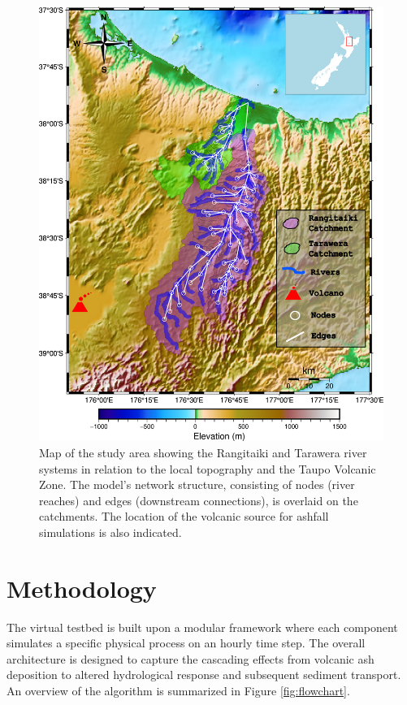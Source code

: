 \documentclass[12pt, a4paper]{article}
\begin{document}
\begin{figure}[H]
    \centering
    \includegraphics[width=1\linewidth]{network.png}
    \caption{Map of the study area showing the Rangitaiki and Tarawera river systems in relation to the local topography and the Taupo Volcanic Zone. The model's network structure, consisting of nodes (river reaches) and edges (downstream connections), is overlaid on the catchments. The location of the volcanic source for ashfall simulations is also indicated.}
    \label{fig:study_area}
\end{figure}


\section{Methodology}
The virtual testbed is built upon a modular framework where each component simulates a specific physical process on an hourly time step. The overall architecture is designed to capture the cascading effects from volcanic ash deposition to altered hydrological response and subsequent sediment transport. An overview of the algorithm is summarized in Figure \ref{fig:flowchart}.
\end{document}
